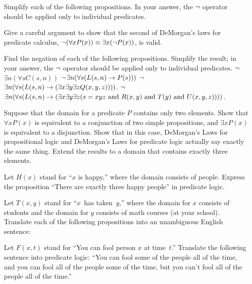 \begin{exercises}

\problem Simplify each of the following propositions.  In your answer, the
$\lnot$ operator should be applied only to individual predicates.

\problem Give a careful argument to show that the second of DeMorgan's laws for
predicate calculus,
$\lnot(\forall x P(x)) \equiv \exists x(\lnot P(x))$, is valid.

\problem Find the negation of each of the following propositions.
Simplify the result; in your answer, the
$\lnot$ operator should be applied only to individual predicates.
\ppart $\lnot$$\exists n (\forall s C(s,n))$
\ppart $\lnot$$\exists n (\forall s (L(s,n) \rightarrow P(s)))$
\ppart $\lnot$$\exists n (\forall s (L(s,n) \rightarrow (\exists x \exists y \exists z Q(x,y,z))))$.
\ppart $\lnot$$\exists n (\forall s (L(s,n) \rightarrow (\exists x \exists y \exists z (s=xyz \text{ and } 
R(x,y) \text{ and } T(y) \text{ and } U(x,y,z))))$.

\problem Suppose that the domain for a predicate $P$
contains only two elements.  Show that $\forall x P(x)$ is equivalent to
a conjunction of two simple propositions, and $\exists x P(x)$ is equivalent
to a disjunction.  Show that in this case, DeMorgan's Laws for propositional
logic and DeMorgan's Laws for predicate logic actually say exactly the same
thing.  Extend the results to a domain that contains exactly
three elements.

\problem Let $H(x)$ stand for ``$x$ is happy,'' where the domain 
consists of people.  Express the proposition ``There are exactly three happy
people'' in predicate logic.

\problem Let $T(x,y)$ stand for ``$x$~has taken~$y$,'' where the
domain for $x$ consists of students and the domain
for $y$ consists of math courses (at your school).
Translate each of the following propositions into an unambiguous English sentence:

\problem Let $F(x,t)$ stand for ``You can fool person $x$ at time~$t$.''
Translate the following sentence into predicate logic:
``You can fool some of the people all of the time, and you can fool
all of the people some of the time, but you can't fool all of the
people all of the time.''


\end{exercises}
